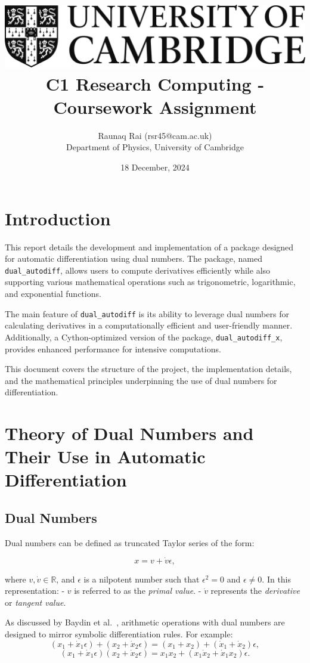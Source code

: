 \documentclass[a4paper,12pt]{article}
\title{
    \includegraphics[scale=0.4]{Cam_logo_bw.png}\\
    \vspace{0.5cm}
    C1 Research Computing - Coursework Assignment
}
\author{Raunaq Rai (rsr45@cam.ac.uk)\\
    Department of Physics, University of Cambridge
}
\date{18 December, 2024}
\begin{document}
\maketitle

\section{Introduction}
This report details the development and implementation of a package designed for automatic differentiation using dual numbers. The package, named \texttt{dual\_autodiff}, allows users to compute derivatives efficiently while also supporting various mathematical operations such as trigonometric, logarithmic, and exponential functions.

The main feature of \texttt{dual\_autodiff} is its ability to leverage dual numbers for calculating derivatives in a computationally efficient and user-friendly manner. Additionally, a Cython-optimized version of the package, \texttt{dual\_autodiff\_x}, provides enhanced performance for intensive computations.

This document covers the structure of the project, the implementation details, and the mathematical principles underpinning the use of dual numbers for differentiation.

\section{Theory of Dual Numbers and Their Use in Automatic Differentiation}

\subsection{Dual Numbers}

Dual numbers can be defined as truncated Taylor series of the form:

\[
x = v + \dot{v}\epsilon,
\]

where \(v, \dot{v} \in \mathbb{R}\), and \(\epsilon\) is a nilpotent number such that \(\epsilon^2 = 0\) and \(\epsilon \neq 0\). In this representation:
- \(v\) is referred to as the \textit{primal value}.
- \(\dot{v}\) represents the \textit{derivative} or \textit{tangent value}.

As discussed by Baydin et al.~\cite{baydin2018automatic}, arithmetic operations with dual numbers are designed to mirror symbolic differentiation rules. For example:
\[
(x_1 + \dot{x}_1\epsilon) + (x_2 + \dot{x}_2\epsilon) = (x_1 + x_2) + (\dot{x}_1 + \dot{x}_2)\epsilon,
\]
\[
(x_1 + \dot{x}_1\epsilon)(x_2 + \dot{x}_2\epsilon) = x_1x_2 + (x_1\dot{x}_2 + \dot{x}_1x_2)\epsilon.
\]
\end{document}
